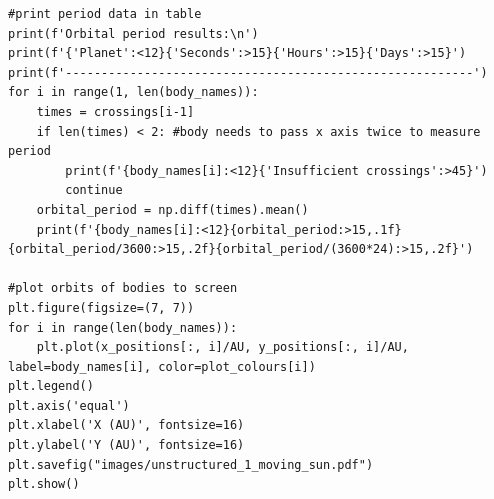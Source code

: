\documentclass[11pt, a4paper, onecolumn]{article}
\begin{document}
\begin{lstlisting}
#print period data in table
print(f'Orbital period results:\n')
print(f'{'Planet':<12}{'Seconds':>15}{'Hours':>15}{'Days':>15}')
print(f'---------------------------------------------------------')
for i in range(1, len(body_names)):
    times = crossings[i-1]
    if len(times) < 2: #body needs to pass x axis twice to measure period
        print(f'{body_names[i]:<12}{'Insufficient crossings':>45}')
        continue
    orbital_period = np.diff(times).mean()
    print(f'{body_names[i]:<12}{orbital_period:>15,.1f}{orbital_period/3600:>15,.2f}{orbital_period/(3600*24):>15,.2f}')

#plot orbits of bodies to screen
plt.figure(figsize=(7, 7))
for i in range(len(body_names)):
    plt.plot(x_positions[:, i]/AU, y_positions[:, i]/AU, label=body_names[i], color=plot_colours[i])
plt.legend()
plt.axis('equal')
plt.xlabel('X (AU)', fontsize=16)
plt.ylabel('Y (AU)', fontsize=16)
plt.savefig("images/unstructured_1_moving_sun.pdf")
plt.show()
\end{lstlisting}
\end{document}
